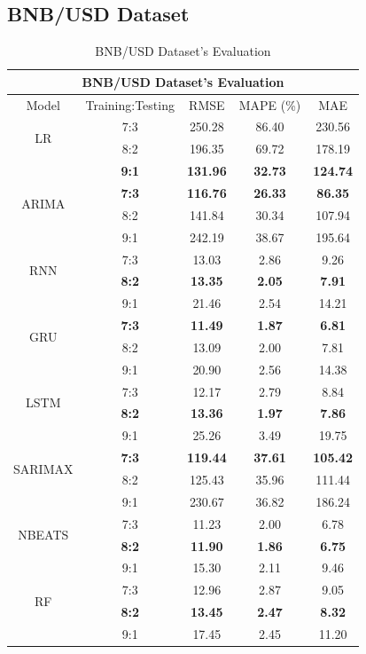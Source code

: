 \documentclass{ieeeojies}
\begin{document}
\subsection{BNB/USD Dataset}
\begin{table}[H]
	\centering
	\begin{tabular}{|c|c|c|c|c|}
		\hline
		\multicolumn{5}{|c|}{\textbf{BNB/USD Dataset's Evaluation}}\\
		\hline
		\centering Model & Training:Testing & RMSE & MAPE (\%) & MAE\\
		\hline
		\multirow{2}{*}{LR} & 7:3 & 250.28 &  86.40 &  230.56\\ & 8:2 & 196.35 & 69.72 & 178.19 \\ & \textbf{9:1} & \textbf{131.96} & \textbf{32.73} & \textbf{124.74}\\
		\hline
		\multirow{2}{*}{ARIMA} & \textbf{7:3} & \textbf{116.76} & \textbf{26.33} & \textbf{86.35} \\ & 8:2 & 141.84 & 30.34 & 107.94 \\ & 9:1 & 242.19 & 38.67 & 195.64\\
		\hline
		\multirow{2}{*}{RNN} & 7:3 & 13.03 & 2.86 & 9.26\\ & \textbf{8:2}& \textbf{13.35} & \textbf{2.05} & \textbf{7.91} \\ & 9:1 & 21.46 & 2.54 & 14.21\\
		\hline
		\multirow{2}{*}{GRU} & \textbf{7:3}	& \textbf{11.49} & \textbf{1.87} &  \textbf{6.81} \\ & 8:2 & 13.09 & 2.00 & 7.81 \\ & 9:1 & 20.90  & 2.56 & 14.38\\
		\hline
		\multirow{2}{*}{LSTM} & 7:3 &  12.17 &  2.79 & 8.84 \\ & \textbf{8:2} &  \textbf{13.36} & \textbf{1.97} & \textbf{7.86} \\ & 9:1 &  25.26  & 3.49 & 19.75\\
		\hline
		\multirow{2}{*}{SARIMAX} & \textbf{7:3}	& \textbf{119.44} & \textbf{37.61} &  \textbf{105.42} \\ & 8:2 & 125.43 & 35.96 & 111.44 \\ & 9:1 & 230.67 &  36.82 & 186.24\\
		\hline
		\multirow{2}{*}{NBEATS} & 7:3 & 11.23 & 2.00 & 6.78 \\ & \textbf{8:2} & \textbf{11.90} & \textbf{1.86} & \textbf{6.75} \\ & 9:1 & 15.30	& 2.11 & 9.46 \\
		\hline
		\multirow{2}{*}{RF} & 7:3 & 12.96 & 2.87 & 9.05 \\ & \textbf{8:2} & \textbf{13.45} & \textbf{2.47} & \textbf{8.32} \\ & 9:1 & 17.45 & 2.45 & 11.20 \\
		\hline
	\end{tabular}
	\caption{BNB/USD Dataset's Evaluation}
	\label{ethresult}
\end{table}
\end{document}
